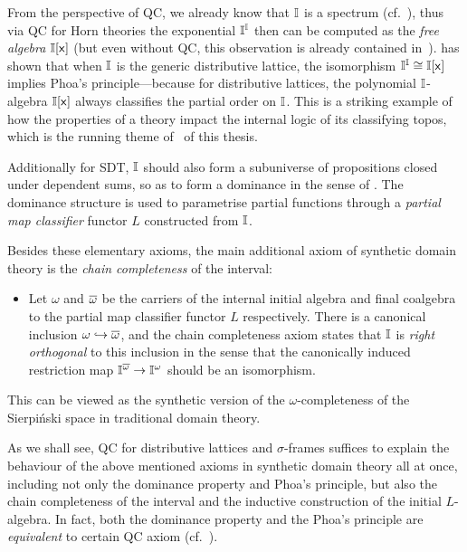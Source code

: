 From the perspective of \gls{QC}, we already know that $\mathbb{I}$ is a spectrum (cf.~), thus via \gls{QC} for Horn theories the exponential $\mathbb{I}^{\mathbb{I}}$ then can be computed as the \emph{free algebra} $\mathbb{I}[\mathsf{x}]$ (but even without \gls{QC}, this observation is already contained in~\citet{RN879}). \citet{gratzer2024directed} has shown that when $\mathbb{I}$ is the generic distributive lattice, the isomorphism $\mathbb{I}^{\mathbb{I}} \cong \mathbb{I}[\mathsf{x}]$ implies Phoa's principle---because for distributive lattices, the polynomial $\mathbb{I}$-algebra $\mathbb{I}[\mathsf{x}]$ always classifies the partial order on $\mathbb{I}$. This is a striking example of how the properties of a theory impact the internal logic of its classifying topos, which is the running theme of~ of this thesis.

Additionally for \gls{SDT}, $\mathbb{I}$ should also form a subuniverse of propositions closed under dependent sums, so as to form a dominance in the sense of \citet{rosolini1986continuity}. The dominance structure is used to parametrise partial functions through a \emph{partial map classifier} functor $L$ constructed from $\mathbb{I}$. 

Besides these elementary axioms, the main additional axiom of synthetic domain theory is the \emph{chain completeness} of the interval: 
\begin{itemize}
  \item[]
  Let $\omega$ and $\overline{\omega}$ be the carriers of the internal initial algebra and final coalgebra to the partial map classifier functor $L$ respectively. There is a canonical inclusion $\omega \hookrightarrow \overline{\omega}$, and the chain completeness axiom states that $\mathbb{I}$ is \emph{right orthogonal} to this inclusion in the sense that the canonically induced restriction map $\mathbb{I}^{\overline{\omega}} \to \mathbb{I}^{\omega}$ should be an isomorphism. 
\end{itemize} 
This can be viewed as the synthetic version of the $\omega$-completeness of the Sierpi\'nski space in traditional domain theory.

As we shall see, \gls{QC} for distributive lattices and $\sigma$-frames suffices to explain the behaviour of the above mentioned axioms in synthetic domain theory all at once, including not only the dominance property and Phoa's principle, but also the chain completeness of the interval and the inductive construction of the initial $L$-algebra. In fact, both the dominance property and the Phoa's principle are \emph{equivalent} to certain \gls{QC} axiom (cf.~).

